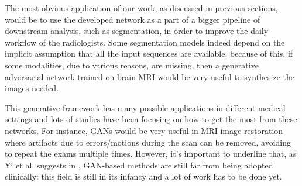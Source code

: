 \vspace{2mm}
\noindent The most obvious application of our work, as discussed in previous sections, would be to use the developed network as a part of a bigger pipeline of downstream analysis, such as segmentation, in order to improve the daily workflow of the radiologists. Some segmentation models indeed depend on the implicit assumption that all the input sequences are available: because of this, if some modalities, due to various reasons, are missing, then a generative adversarial network trained on brain \ac{MRI} would be very useful to synthesize the images needed.

This generative framework has many possible applications in different medical settings and lots of studies have been focusing on how to get the most from these networks. For instance, \ac{GAN}s would be very useful in \ac{MRI} image restoration where artifacts due to errors/motions during the scan can be removed, avoiding to repeat the exams multiple times. However, it's important to underline that, as Yi et al. suggests in \cite{Yi_2019}, \ac{GAN}-based methods are still far from being adopted clinically: this field is still in its infancy and a lot of work has to be done yet.